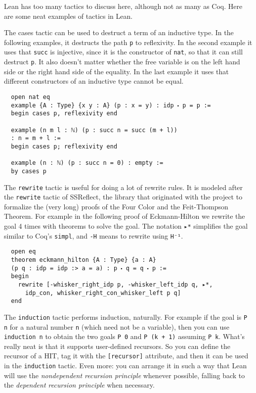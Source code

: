\documentclass[12pt]{amsart}  %
\begin{document}
\begin{enumerate}
Lean has too many tactics to discuss here, although not as many as Coq.
Here are some neat examples of tactics in Lean.

The cases tactic can be used to destruct a term of an inductive type. In the following examples,
it destructs the path \lstinline{p} to reflexivity. In the second example it uses that \lstinline{succ} is
injective, since it is the constructor of \lstinline{nat}, so that it can still destruct \lstinline{p}.
It also doesn't matter whether the free variable is on the left hand side or the right hand
side of the equality. In the last example it uses that different constructors of an inductive type cannot be equal.

\begin{lstlisting}
  open nat eq
  example {A : Type} {x y : A} (p : x = y) : idp ⬝ p = p :=
  begin cases p, reflexivity end
  
  example (n m l : ℕ) (p : succ n = succ (m + l))
  : n = m + l :=
  begin cases p; reflexivity end
  
  example (n : ℕ) (p : succ n = 0) : empty :=
  by cases p
\end{lstlisting}

The \lstinline{rewrite} tactic is useful for doing a lot of rewrite rules.
It is modeled after the \lstinline{rewrite} tactic of SSReflect, the library that originated with
the project to formalize the (very long) proofs of the Four Color and the Feit-Thompson
Theorem. For example in the following proof of Eckmann-Hilton we rewrite the goal 4
times with theorems to solve the goal. The notation \lstinline{▸*} simplifies the goal
similar to Coq's \lstinline{simpl}, and \lstinline{-H} means to rewrite using \lstinline{H⁻¹}.

\begin{lstlisting}
  open eq
  theorem eckmann_hilton {A : Type} {a : A}
  (p q : idp = idp :> a = a) : p ⬝ q = q ⬝ p :=
  begin
    rewrite [-whisker_right_idp p, -whisker_left_idp q, ▸*,
      idp_con, whisker_right_con_whisker_left p q]
  end
\end{lstlisting}

The \lstinline{induction} tactic performs induction, naturally. For example if the goal is \lstinline{P n} for
a natural number \lstinline{n} (which need not be a variable), then you can use \lstinline{induction n} to
obtain the two goals \lstinline{P 0} and \lstinline{P (k + 1)} assuming \lstinline{P k}. What's really neat is
that it supports user-defined recursors. So you can define the recursor of a HIT, tag it
with the \lstinline{[recursor]} attribute, and then it can be used in the \lstinline{induction} tactic.
Even more: you can arrange it in such a way that Lean will use the \emph{nondependent recursion principle}
whenever possible, falling back to the \emph{dependent recursion principle} when necessary.


\end{enumerate}
\end{document}
